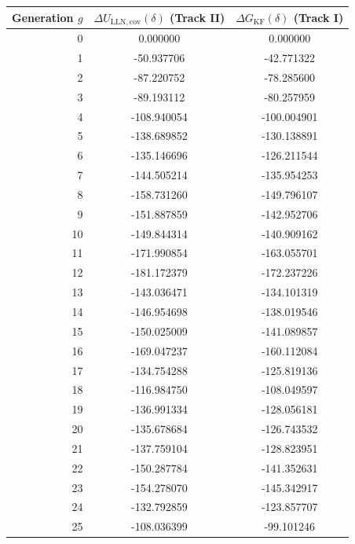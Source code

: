 \documentclass{article}
\theoremstyle{plain}
\theoremstyle{definition}
\theoremstyle{remark}
\begin{document}
\begin{table}[ht!]
\scriptsize
\setlength{\tabcolsep}{7pt}
\begin{minipage}[t]{0.4\textwidth}
\vspace{0pt}
\begin{tabular}{rcc}
\toprule
Generation $g$ & $\Delta U_{\mathrm{LLN,cov}}(\delta)$ (Track II) & $\Delta G_{\mathrm{KF}}(\delta)$ (Track I) \\
\midrule
0 & 0.000000 & 0.000000 \\
1 & -50.937706 & -42.771322 \\
2 & -87.220752 & -78.285600 \\
3 & -89.193112 & -80.257959 \\
4 & -108.940054 & -100.004901 \\
5 & -138.689852 & -130.138891 \\
6 & -135.146696 & -126.211544 \\
7 & -144.505214 & -135.954253 \\
8 & -158.731260 & -149.796107 \\
9 & -151.887859 & -142.952706 \\
10 & -149.844314 & -140.909162 \\
11 & -171.990854 & -163.055701 \\
12 & -181.172379 & -172.237226 \\
13 & -143.036471 & -134.101319 \\
14 & -146.954698 & -138.019546 \\
15 & -150.025009 & -141.089857 \\
16 & -169.047237 & -160.112084 \\
17 & -134.754288 & -125.819136 \\
18 & -116.984750 & -108.049597 \\
19 & -136.991334 & -128.056181 \\
20 & -135.678684 & -126.743532 \\
21 & -137.759104 & -128.823951 \\
22 & -150.287784 & -141.352631 \\
23 & -154.278070 & -145.342917 \\
24 & -132.792859 & -123.857707 \\
25 & -108.036399 & -99.101246 \\
\bottomrule
\end{tabular}
\end{minipage}
\hspace{2cm}
\begin{minipage}[t]{0.4\textwidth}

\end{minipage}
\end{table}
\end{document}
